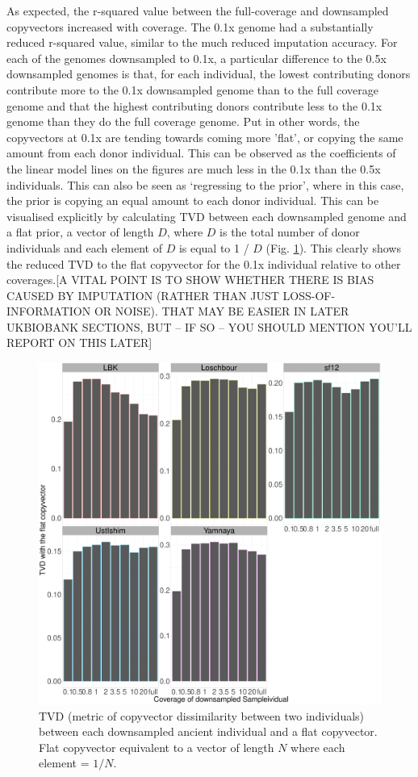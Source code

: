 As expected, the r-squared value between the full-coverage and downsampled copyvectors increased with coverage. The 0.1x genome had a substantially reduced r-squared value, similar to the much reduced imputation accuracy. For each of the genomes downsampled to 0.1x, a particular difference to the 0.5x downsampled genomes is that, for each individual, the lowest contributing donors contribute more to the 0.1x downsampled genome than to the full coverage genome and that the highest contributing donors contribute less to the 0.1x genome than they do the full coverage genome. Put in other words, the copyvectors at 0.1x are tending towards coming more 'flat', or copying the same amount from each donor individual. This can be observed as the coefficients of the linear model lines on the figures are much less in the 0.1x than the 0.5x individuals. This can also be seen as `regressing to the prior', where in this case, the prior is copying an equal amount to each donor individual. This can be visualised explicitly by calculating TVD between each downsampled genome and a flat prior, a vector of length $D$, where $D$ is the total number of donor individuals and each element of $D$ is equal to 1 / $D$ (Fig. \ref{fig:TVD_ancients_flat_prior}). This clearly shows the reduced TVD to the flat copyvector for the 0.1x individual relative to other coverages.{\color{red}[A VITAL POINT IS TO SHOW WHETHER THERE IS BIAS CAUSED BY IMPUTATION (RATHER THAN JUST LOSS-OF-INFORMATION OR NOISE). THAT MAY BE EASIER IN LATER UKBIOBANK SECTIONS, BUT -- IF SO -- YOU SHOULD MENTION YOU'LL REPORT ON THIS LATER]}

\begin{figure}[htp]
    \centering
    \includegraphics[width=1.0\textwidth]{../images/chapter1/TVD_ancients_flat_prior.pdf}
    \caption{TVD (metric of copyvector dissimilarity between two individuals) between each downsampled ancient individual and a flat copyvector. Flat copyvector equivalent to a vector of length $N$ where each element = $1/N$.}
    \label{fig:TVD_ancients_flat_prior}
\end{figure}

